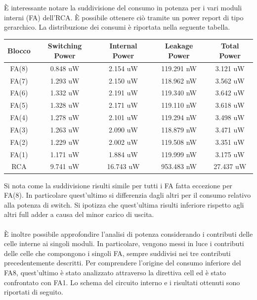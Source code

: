 \documentclass[11pt,  english, makeidx, a4paper, titlepage, oneside]{book}
\begin{document}
È interessante notare la suddivisione del consumo in potenza per i vari moduli interni (FA) dell'RCA. È possibile ottenere ciò tramite un power report di tipo gerarchico. La distribuzione dei consumi è riportata nella seguente tabella.
\\
\begin{center}
	\begin{tabular}{|c|c|c|c|c|}
	\hline
	Blocco &  Switching Power & Internal Power & Leakage Power & Total Power \\ 
	\hline
	FA(8) & 0.848 uW & 2.154 uW & 119.291 nW & 3.121 uW  \\
	\hline
	FA(7) & 1.293 uW & 2.150 uW & 118.962 nW & 3.562 uW  \\
	\hline
	FA(6) & 1.332 uW & 2.191 uW & 119.340 nW & 3.642 uW  \\
	\hline
	FA(5) & 1.328 uW & 2.171 uW & 119.110 nW & 3.618 uW  \\
	\hline
	FA(4) & 1.278 uW & 2.101 uW & 119.294 nW & 3.498 uW  \\
	\hline
	FA(3) & 1.263 uW & 2.090 uW & 118.879 nW & 3.471 uW  \\
	\hline
	FA(2) & 1.229 uW & 2.002 uW & 119.508 nW & 3.351 uW  \\
	\hline
	FA(1) & 1.171 uW & 1.884 uW & 119.999 nW & 3.175 uW  \\
	\hline
	RCA & 9.741 uW & 16.743 uW & 953.483 nW & 27.437 uW  \\
	\hline
	\end{tabular}
\end{center}
\vspace{0.3cm}
Si nota come la suddivisione risulti simile per tutti i FA fatta eccezione per FA(8). In particolare quest'ultimo si differenzia dagli altri per il consumo relativo alla potenza di switch. Si ipotizza che quest'ultima risulti inferiore rispetto agli altri full adder a causa del minor carico di uscita.
\\\\
È inoltre possibile approfondire l'analisi di potenza considerando i contributi delle celle interne ai singoli moduli. In particolare, vengono messi in luce i contributi delle celle che compongono i singoli FA, sempre suddivisi nei tre contributi precedentemente descritti.
Per comprendere l'origine del consumo inferiore del FA8, quest'ultimo è stato analizzato attraverso la direttiva cell ed è stato confrontato con FA1.
Lo schema del circuito interno e i risultati ottenuti sono riportati di seguito.
\\\\
\end{document}
